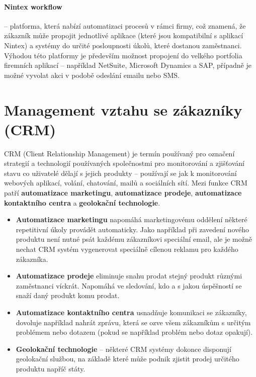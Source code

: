 \paragraph{Nintex workflow} -- platforma, která nabízí automatizaci procesů v rámci firmy, což znamená, že zákazník může propojit jednotlivé aplikace (které jsou kompatibilní s aplikací Nintex) a systémy do určité posloupnosti úkolů, které dostanou zaměstnanci. Výhodou této platformy je především možnost propojení do velkého portfolia firemních aplikací -- například NetSuite, Microsoft Dynamics a SAP, případně je možné vyvolat akci v podobě odeslání emailu nebo SMS.

\section{Management vztahu se zákazníky (CRM)}
\par CRM (Client Relationship Management) je termín používaný pro označení strategií a technologií používaných společnostmi pro monitorování a zjišťování stavu co uživatelé dělají s jejich produkty -- používají se jak k monitorování webových aplikací, volání, chatování, mailů a sociálních sítí. Mezi funkce CRM patří \textbf{automatizace marketingu}, \textbf{automatizace prodeje}, \textbf{automatizace kontaktního centra} a \textbf{geolokační technologie}. \cite{crm}

\begin{itemize}
\item \textbf{Automatizace marketingu} napomáhá marketingovému oddělení některé repetitivní úkoly provádět automaticky. Jako například při zavedení nového produktu není nutné psát každému zákazníkovi speciální email, ale je možně nechat CRM systém vygenerovat speciálně cílenou reklamu pro každého zákazníka.
\item \textbf{Automatizace prodeje} eliminuje snahu prodat stejný produkt různými zaměstnanci víckrát. Napomáhá ve sledování, kdo a s jakou úspěšností se snaží daný produkt komu prodat.
\item \textbf{Automatizace kontaktního centra} usnadňuje komunikaci se zákazníky, dovoluje například nahrát zprávu, která se ozve všem zákazníkům s určitým problémem nebo dotazem (pokud se například problém nebo dotaz opakují).
\item \textbf{Geolokační technologie} -- některé CRM systémy dokonce disponují geolokační službou, na základě které může podnik zjistit prodej určitého produktu napříč státy. \cite{crm}
\end{itemize}

